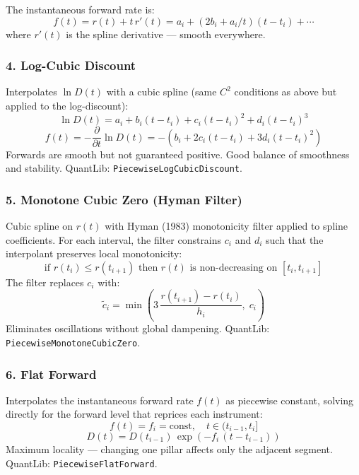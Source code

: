 \documentclass[11pt, a4paper]{article}
\begin{document}
The instantaneous forward rate is:
\begin{equation}
  f(t) = r(t) + t\,r'(t)
       = a_i + (2b_i + a_i/t)(t-t_i) + \cdots
\end{equation}
where $r'(t)$ is the spline derivative — smooth everywhere.

\subsubsection{4. Log-Cubic Discount}

Interpolates $\ln D(t)$ with a cubic spline (same $C^2$ conditions as above
but applied to the log-discount):
\begin{equation}
  \ln D(t) = a_i + b_i(t-t_i) + c_i(t-t_i)^2 + d_i(t-t_i)^3
\end{equation}
\begin{equation}
  f(t) = -\frac{\partial}{\partial t}\ln D(t) = -(b_i + 2c_i(t-t_i) + 3d_i(t-t_i)^2)
\end{equation}
Forwards are smooth but not guaranteed positive. Good balance of smoothness and
stability. QuantLib: \texttt{PiecewiseLogCubicDiscount}.

\subsubsection{5. Monotone Cubic Zero (Hyman Filter)}

Cubic spline on $r(t)$ with Hyman (1983) monotonicity filter applied to spline
coefficients. For each interval, the filter constrains $c_i$ and $d_i$ such that
the interpolant preserves local monotonicity:
\begin{equation}
  \text{if } r(t_i) \leq r(t_{i+1}) \text{ then }
  r(t) \text{ is non-decreasing on } [t_i, t_{i+1}]
\end{equation}
The filter replaces $c_i$ with:
\begin{equation}
  \tilde{c}_i = \min\!\left(3\,\frac{r(t_{i+1})-r(t_i)}{h_i},\; c_i\right)
\end{equation}
Eliminates oscillations without global dampening. QuantLib: \texttt{PiecewiseMonotoneCubicZero}.

\subsubsection{6. Flat Forward}

Interpolates the instantaneous forward rate $f(t)$ as piecewise constant, solving
directly for the forward level that reprices each instrument:
\begin{equation}
  f(t) = f_i = \text{const}, \quad t \in (t_{i-1}, t_i]
\end{equation}
\begin{equation}
  D(t) = D(t_{i-1})\,\exp\!\left(-f_i\,(t - t_{i-1})\right)
\end{equation}
Maximum locality — changing one pillar affects only the adjacent segment.
QuantLib: \texttt{PiecewiseFlatForward}.
\end{document}
